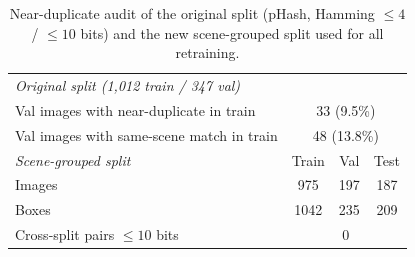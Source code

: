 \begin{table}[!t]
\centering
\caption{Near-duplicate audit of the original split (pHash, Hamming $\leq4$ / $\leq10$ bits) and the new
scene-grouped split used for all retraining.}
\label{tab:split}
\setlength{\tabcolsep}{4pt}
\begin{tabular}{lccc}
\toprule
\multicolumn{4}{l}{\textit{Original split (1,012 train / 347 val)}} \\
Val images with near-duplicate in train & \multicolumn{3}{c}{33 (9.5\%)} \\
Val images with same-scene match in train & \multicolumn{3}{c}{48 (13.8\%)} \\
\midrule
\textit{Scene-grouped split} & Train & Val & Test \\
Images & 975 & 197 & 187 \\
Boxes & 1042 & 235 & 209 \\
Cross-split pairs $\leq10$ bits & \multicolumn{3}{c}{0} \\
\bottomrule
\end{tabular}
\end{table}
